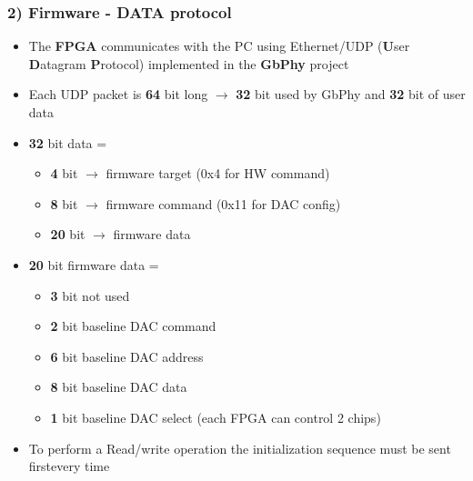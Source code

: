\documentclass[aspectratio=169]{beamer}
\begin{document}
	\begin{frame}
	\frametitle{2) Firmware - DATA protocol}
	\begin{itemize}
		\item The \textbf{FPGA} communicates with the PC using Ethernet/UDP (\textbf{U}ser \textbf{D}atagram \textbf{P}rotocol) implemented in the \textbf{GbPhy} project
		\item Each UDP packet is \textbf{64} bit long $\rightarrow$ \textbf{32} bit used by GbPhy and \textbf{32} bit of user data
		\item \textbf{32} bit data =
		\begin{itemize}
			\item \textbf{4} bit $\rightarrow$ firmware target (0x4 for HW command)
			\item \textbf{8} bit $\rightarrow$ firmware command (0x11 for DAC config)
			\item \textbf{20} bit $\rightarrow$ firmware data
		\end{itemize}
		\item \textbf{20} bit firmware data =
		\begin{itemize}
			\item \textbf{3} bit not used
			\item \textbf{2} bit baseline DAC command
			\item \textbf{6} bit baseline DAC address
			\item \textbf{8} bit baseline DAC data
			\item \textbf{1} bit baseline DAC select (each FPGA can control 2 chips)
		\end{itemize}
		\item To perform a Read/write operation the initialization sequence must be sent first\newline every time
	\end{itemize}
	\end{frame}
\end{document}

